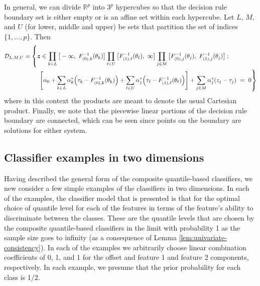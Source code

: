 In general, we can divide $\mathbb{R}^p$ into $3^p$ hypercubes so that the
decision rule boundary set is either empty or is an affine set within each
hypercube.  Let $L$, $M$, and $U$ (for lower, middle and upper) be sets that
partition the set of indices $\{1, \dots, p\}$.  Then
\begin{equation}
  \label{eq:composite-classifiers-general}
  \begin{split}
    \mathcal{D}_{L,M,U} = \left\{
      \vec{z} \in
      \prod_{k \in L} \big[ -\infty,~ F_{(0),k}^{-1}(\theta_k) \big]
      \prod_{\ell \in U} \big[ F_{(1),\ell}^{-1}(\theta_{\ell}),~ \infty \big]
      \prod_{j \in M} \big[ F_{(0),j}^{-1}(\theta_j),~ F_{(1),j}^{-1}(\theta_j) \big] :
      \phantom{\hspace{15mm}}
    \right.  \\
    \left.
      \left[
        \alpha_0 + 
        \sum_{k \in L} \alpha_k^{*} \Big(\tau_k - F_{(0),k}^{-1}(\theta_k)\Big) +
        \sum_{\ell \in U} \alpha_j^{*} \Big(\tau_{\ell} - F_{(1),\ell}^{-1}(\theta_{\ell})\Big)
      \right] +
        \sum_{j \in M} \alpha_j^{*} (z_j - \tau_j) ~=~ 0
    \right\}
  \end{split}
\end{equation}
where in this context the products are meant to denote the usual Cartesian
product.  Finally, we note that the piecewise linear portions of the decision
rule boundary are connected, which can be seen since points on the boundary are
solutions for either system.


\subsection{Classifier examples in two dimensions}
\label{sec:classifier-examples}

Having described the general form of the composite quantile-based classifiers,
we new consider a few simple examples of the classifiers in two dimensions.  In
each of the examples, the classifier model that is presented is that for the
optimal choice of quantile level for each of the features in terms of the
feature's ability to discriminate between the classes.  These are the quantile
levels that are chosen by the composite quantile-based classifiers in the limit
with probability 1 as the sample size goes to infinity (as a consequence of
Lemma \ref{lem:univariate-consistency}).  In each of the examples we arbitrarily
choose linear combination coefficients of 0, 1, and 1 for the offset and feature
1 and feature 2 components, respectively.  In each example, we presume that the
prior probability for each class is 1/2.


